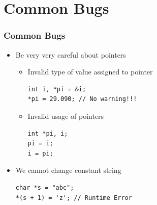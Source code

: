 \documentclass{../c-lecture}
\begin{document}
\section{Common Bugs}

\begin{frame}[fragile]
  \frametitle{Common Bugs}
  \begin{itemize}
    \item
      Be {\color{Orange} very very} careful about pointers
    \begin{itemize}
      \item Invalid type of value assigned to pointer
      \begin{verbatim}
int i, *pi = &i;
*pi = 29.090; // No warning!!!
      \end{verbatim}
      \item Invalid usage of pointers
      \begin{verbatim}
int *pi, i;
pi = i;
i = pi;
      \end{verbatim}
    \end{itemize}
  \end{itemize}
\end{frame}

\begin{frame}[fragile]
  \begin{itemize}
    \item We cannot change constant string
    \begin{verbatim}
char *s = "abc";
*(s + 1) = 'z'; // Runtime Error
    \end{verbatim}
  \end{itemize}
\end{frame}
\end{document}
